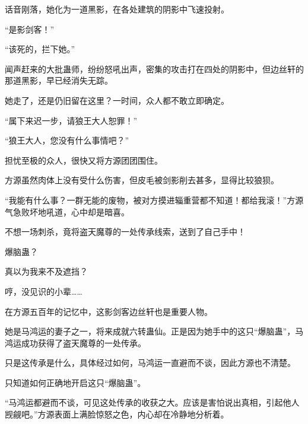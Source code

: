 \begin{this_body}
话音刚落，她化为一道黑影，在各处建筑的阴影中飞速投射。

“是影剑客！”

“该死的，拦下她。”

闻声赶来的大批蛊师，纷纷怒吼出声，密集的攻击打在四处的阴影中，但边丝轩的那道黑影，早已经消失无踪。

她走了，还是仍旧留在这里？一时间，众人都不敢立即确定。

“属下来迟一步，请狼王大人恕罪！”

“狼王大人，您没有什么事情吧？”

担忧至极的众人，很快又将方源团团围住。

方源虽然肉体上没有受什么伤害，但皮毛被剑影削去甚多，显得比较狼狈。

“我能有什么事？一群无能的废物，被对方摸进辎重营都不知道！都给我滚！”方源气急败坏地吼道，心中却是暗喜。

不想一场刺杀，竟将盗天魔尊的一处传承线索，送到了自己手中！

爆脑蛊？

真以为我来不及遮挡？

哼，没见识的小辈……

在方源五百年的记忆中，这影剑客边丝轩也是重要人物。

她是马鸿运的妻子之一，将来成就六转蛊仙。正是因为她手中的这只“爆脑蛊”，马鸿运成功获得了盗天魔尊的一处传承。

只是这传承是什么，具体经过如何，马鸿运一直避而不谈，因此方源也不清楚。

只知道如何正确地开启这只“爆脑蛊”。

“马鸿运都避而不谈，可见这处传承的收获之大。应该是害怕说出真相，引起他人觊觎吧。”方源表面上满脸惊怒之色，内心却在冷静地分析着。

\end{this_body}

